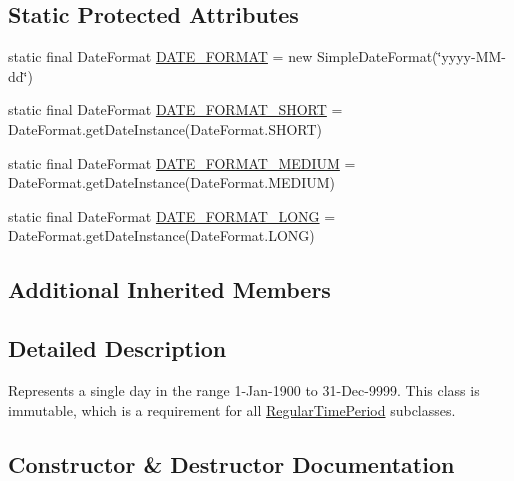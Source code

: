 \subsection*{Static Protected Attributes}
\begin{DoxyCompactItemize}
\item 
static final Date\+Format \mbox{\hyperlink{classorg_1_1jfree_1_1data_1_1time_1_1_day_aff816abd46d5f7b2da31d795478c0f97}{D\+A\+T\+E\+\_\+\+F\+O\+R\+M\+AT}} = new Simple\+Date\+Format(\char`\"{}yyyy-\/MM-\/dd\char`\"{})
\item 
static final Date\+Format \mbox{\hyperlink{classorg_1_1jfree_1_1data_1_1time_1_1_day_a17c3e2d665348d6619a7e42acfd1c5d6}{D\+A\+T\+E\+\_\+\+F\+O\+R\+M\+A\+T\+\_\+\+S\+H\+O\+RT}} = Date\+Format.\+get\+Date\+Instance(Date\+Format.\+S\+H\+O\+RT)
\item 
static final Date\+Format \mbox{\hyperlink{classorg_1_1jfree_1_1data_1_1time_1_1_day_a89878a562fbb7d271048c3a1001fda25}{D\+A\+T\+E\+\_\+\+F\+O\+R\+M\+A\+T\+\_\+\+M\+E\+D\+I\+UM}} = Date\+Format.\+get\+Date\+Instance(Date\+Format.\+M\+E\+D\+I\+UM)
\item 
static final Date\+Format \mbox{\hyperlink{classorg_1_1jfree_1_1data_1_1time_1_1_day_ab436268da73f3d1d7f1cfd910c068a37}{D\+A\+T\+E\+\_\+\+F\+O\+R\+M\+A\+T\+\_\+\+L\+O\+NG}} = Date\+Format.\+get\+Date\+Instance(Date\+Format.\+L\+O\+NG)
\end{DoxyCompactItemize}
\subsection*{Additional Inherited Members}


\subsection{Detailed Description}
Represents a single day in the range 1-\/\+Jan-\/1900 to 31-\/\+Dec-\/9999. This class is immutable, which is a requirement for all \mbox{\hyperlink{classorg_1_1jfree_1_1data_1_1time_1_1_regular_time_period}{Regular\+Time\+Period}} subclasses. 

\subsection{Constructor \& Destructor Documentation}
\mbox{\label{classorg_1_1jfree_1_1data_1_1time_1_1_day_a4cc7fdf2720032a2f3e489e3617655eb}} 
